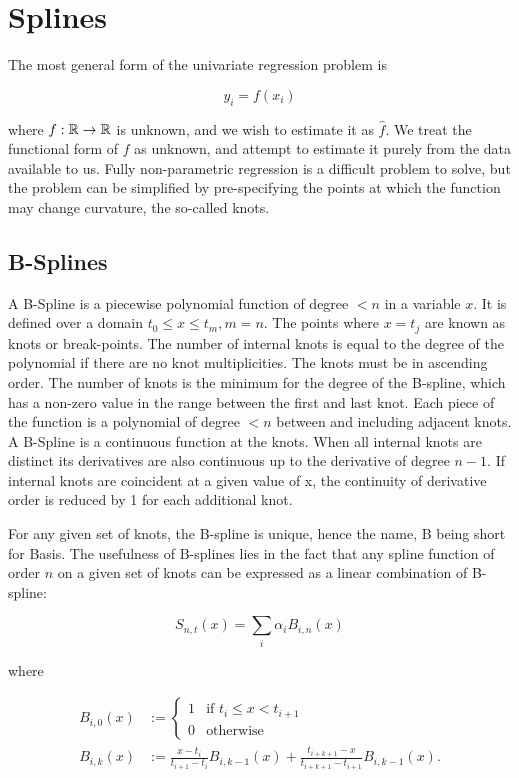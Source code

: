 \documentclass{amsart}[12pt]
\begin{document}
\section{Splines}
The most general form of the univariate regression problem is

\[
	y_i = f(x_i)
\]

where $f: {\mathbb{R}} \to {\mathbb{R}}$ is unknown, and we wish to estimate it as $\hat{f}$. We treat the functional form of
$f$ as unknown, and attempt to estimate it purely from the data available to us. Fully non-parametric regression
is a difficult problem to solve, but the problem can be simplified by pre-specifying the points at which the
function may change curvature, the so-called knots.

\subsection{B-Splines}
A B-Spline is a piecewise polynomial function of degree $< n$ in a variable $x$. It is defined over a
domain $t_0 \leq x \leq t_m, m=n$. The points where $x = t_j$ are known as knots or break-points. The
number of internal knots is equal to the degree of the polynomial if there are no knot multiplicities.
The knots must be in ascending order. The number of knots is the minimum for the degree of the B-spline,
which has a non-zero value in the range between the first and last knot. Each piece of the function is a
polynomial of degree $< n$ between and including adjacent knots. A B-Spline is a continuous function at the
knots. When all internal knots are distinct its derivatives are also continuous up to the derivative of degree
$n - 1$. If internal knots are coincident at a given value of x, the continuity of derivative order is reduced
by 1 for each additional knot.

For any given set of knots, the B-spline is unique, hence the name, B being short for Basis. The usefulness
of B-splines lies in the fact that any spline function of order $n$ on a given set of knots can be expressed
as a linear combination of B-spline:

$$
S_{n, t}(x) = \sum_i \alpha_i B_{i, n}(x)
$$

where

\begin{align*}
B_{i, 0}(x) &:= \begin{cases}
1 & \text{if } t_i \leq x < t_{i+1} \\
0 & \text{otherwise}
\end{cases} \\
B_{i, k}(x) &:= \frac{x - t_i}{t_{i + 1} - t_i} B_{i, k-1} (x) + \frac{t_{i + k + 1} - x}{t_{i + k + 1} - t_{i + 1}} B_{i, k-1} (x).
\end{align*}
\end{document}
